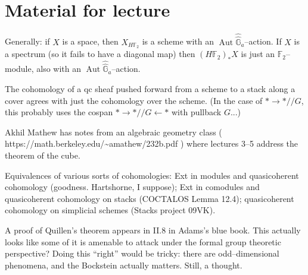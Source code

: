 \documentclass[12pt]{book}
\newcommand{\F}{\mathbb F}
\newcommand{\G}{\widehat{\mathbb G}}
\newcommand{\<}{\langle}
\renewcommand{\>}{\rangle}
\newcommand{\mmod}{/\!\!/}
\DeclareMathOperator{\Aut}{Aut}
\numberwithin{equation}{section}
\theoremstyle{plain}
\theoremstyle{definition}
\theoremstyle{remark}
\begin{document}
\mainmatter






\renewcommand\chaptername{Case Study}
\renewcommand\cftchappresnum{{Case Study}\space}

















\backmatter

\chapter*{Material for lecture}







Generally: if $X$ is a space, then $X_{H\F_2}$ is a scheme with an $\Aut \widehat \G_a$--action. If $X$ is a spectrum (so it fails to have a diagonal map) then $(H\F_2)_* X$ is just an $\F_2$--module, also with an $\Aut \widehat \G_a$--action.

The cohomology of a qc sheaf pushed forward from a scheme to a stack along a cover agrees with just the cohomology over the scheme. (In the case of $* \to * \mmod G$, this probably uses the cospan $* \to * \mmod G \leftarrow *$ with pullback $G$...)

Akhil Mathew has notes from an algebraic geometry class ( https://math.berkeley.edu/{\textasciitilde}amathew/232b.pdf ) where lectures 3--5 address the theorem of the cube.

Equivalences of various sorts of cohomologies: Ext in modules and quasicoherent cohomology (goodness. Hartshorne, I suppose); Ext in comodules and quasicoherent cohomology on stacks (COCTALOS Lemma 12.4); quasicoherent cohomology on simplicial schemes (Stacks project 09VK).

A proof of Quillen's theorem appears in II.8 in Adams's blue book. This actually looks like some of it is amenable to attack under the formal group theoretic perspective? Doing this ``right'' would be tricky: there are odd--dimensional phenomena, and the Bockstein actually matters. Still, a thought.
\end{document}
